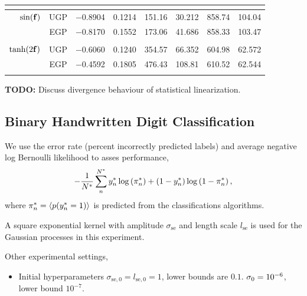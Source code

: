 \documentclass{article} %
\begin{document}
\begin{table}[htb]
\begin{tabular}{r|c| c c c c c c}
            & \cite{Opper2009} \\
        \midrule
        $\sin\!\left({\mathbf{f}}\right)$ 
            & UGP & $-$0.8904 & 0.1214 & 151.16 & 30.212 & 858.74 & 104.04 \\
            & EGP & $-$0.8170 & 0.1552 & 173.06 & 41.686 & 858.33 & 103.47 \\
            & \cite{Opper2009} \\
        \midrule
        $\tanh\!\left({2\mathbf{f}}\right)$
            & UGP & $-$0.6060 & 0.1240 & 354.57 & 66.352 & 604.98 & 62.572 \\
            & EGP & $-$0.4592 & 0.1805 & 476.43 & 108.81 & 610.52 & 62.544 \\
            & \cite{Opper2009} \\
        \bottomrule
    \end{tabular}
\end{table}


\textbf{TODO:} Discuss divergence behaviour of statistical linearization.


\subsection{Binary Handwritten Digit Classification}

We use the error rate (percent incorrectly predicted labels) and average 
negative log Bernoulli likelihood to asses performance,
\begin{equation}
    - \frac{1}{N^{*}} \sum^{N^{*}}_{n} y^{*}_n 
        \log\left({\pi^{*}_n}\right)
    + \left({1-y^{*}_n}\right)\log\left({1 - \pi^{*}_n}\right),
\end{equation}
where $\pi^{*}_n = \left\langle{\ensuremath{p\!\left({y^{*}_n = 1}\right)}}\right\rangle_{}$ is predicted from the
classifications algorithms.

A square exponential kernel with amplitude $\sigma_\text{se}$ and length
scale $l_\text{se}$ is used for the Gaussian processes in this experiment.

Other experimental settings,
\begin{itemize}
    \item Initial hyperparameters $\sigma_{\text{se},0} = l_{\text{se},0} = 1$, 
        lower bounds are $0.1$. $\sigma_0 = 10^{-6}$, lower bound $10^{-7}$.
\end{itemize}
\end{document}
